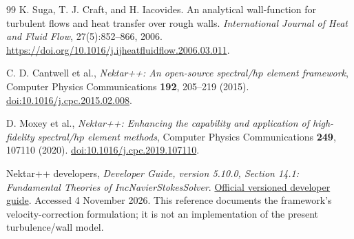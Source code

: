 \documentclass[11pt,a4paper]{article}
\numberwithin{equation}{section}
\begin{document}
\begin{thebibliography}{99}
K. Suga, T. J. Craft, and H. Iacovides.
An analytical wall-function for turbulent flows and heat transfer
over rough walls.
\emph{International Journal of Heat and Fluid Flow},
27(5):852--866, 2006.
\url{https://doi.org/10.1016/j.ijheatfluidflow.2006.03.011}.

C. D. Cantwell et al.,
\emph{Nektar++: An open-source spectral/$hp$ element framework},
Computer Physics Communications \textbf{192}, 205--219 (2015).
\href{https://doi.org/10.1016/j.cpc.2015.02.008}
{doi:10.1016/j.cpc.2015.02.008}.

D. Moxey et al.,
\emph{Nektar++: Enhancing the capability and application of
high-fidelity spectral/$hp$ element methods},
Computer Physics Communications \textbf{249}, 107110 (2020).
\href{https://doi.org/10.1016/j.cpc.2019.107110}
{doi:10.1016/j.cpc.2019.107110}.

Nektar++ developers,
\emph{Developer Guide, version 5.10.0, Section 14.1:
Fundamental Theories of IncNavierStokesSolver}.
\href{https://doc.nektar.info/developerguide/5.10.0/developer-guidese49.html}
{Official versioned developer guide}.
Accessed 4 November 2026.  This reference documents the framework's
velocity-correction formulation; it is not an implementation of the
present turbulence/wall model.

\end{thebibliography}
\end{document}
